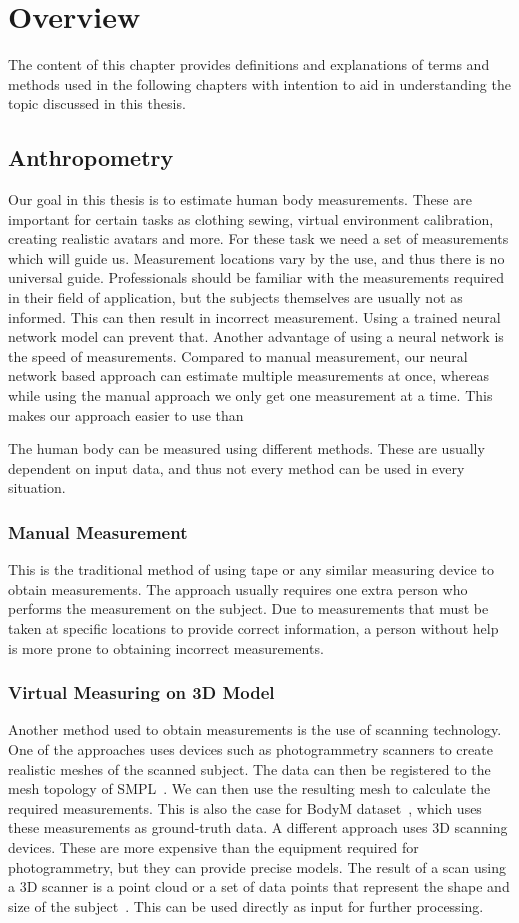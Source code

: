 \chapter{Overview}
The content of this chapter provides definitions and explanations of terms and methods used in the following chapters with intention to aid in understanding the topic discussed in this thesis.

\section{Anthropometry}
Our goal in this thesis is to estimate human body measurements. These are important for certain tasks as clothing sewing, virtual environment calibration, creating realistic avatars and more. For these task we need a set of measurements which will guide us. Measurement locations vary by the use, and thus there is no universal guide. Professionals should be familiar with the measurements required in their field of application, but the subjects themselves are usually not as informed. This can then result in incorrect measurement. Using a trained neural network model can prevent that. Another advantage of using a neural network is the speed of measurements. Compared to manual measurement, our neural network based approach can estimate multiple measurements at once, whereas while using the manual approach we only get one measurement at a time. This makes our approach easier to use than 

The human body can be measured using different methods. These are usually dependent on input data, and thus not every method can be used in every situation.  

\subsection{Manual Measurement}
This is the traditional method of using tape or any similar measuring device to obtain measurements. The approach usually requires one extra person who performs the measurement on the subject. Due to measurements that must be taken at specific locations to provide correct information, a person without help is more prone to obtaining incorrect measurements.


\subsection{Virtual Measuring on 3D Model}
\label{3Ddata}
Another method used to obtain measurements is the use of scanning technology. One of the approaches uses devices such as photogrammetry scanners to create realistic meshes of the scanned subject. The data can then be registered to the mesh topology of SMPL~\cite{smpl}. We can then use the resulting mesh to calculate the required measurements. This is also the case for BodyM dataset~\cite{BodyM}, which uses these measurements as ground-truth data. 
A different approach uses 3D scanning devices. These are more expensive than the equipment required for photogrammetry, but they can provide precise models. The result of a scan using a 3D scanner is a point cloud or a set of data points that represent the shape and size of the subject~\cite{3dScan}. This can be used directly as input for further processing.
